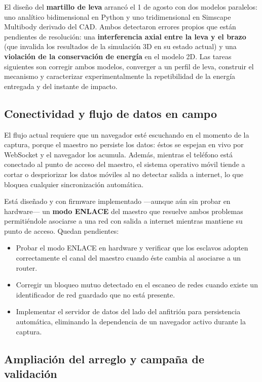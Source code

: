 El dise\~no del \textbf{martillo de leva} arranc\'o el 1 de agosto con dos modelos
paralelos: uno anal\'itico bidimensional en Python y uno tridimensional en Simscape
Multibody derivado del CAD. Ambos detectaron errores propios que est\'an pendientes de
resoluci\'on: una \textbf{interferencia axial entre la leva y el brazo} (que invalida los
resultados de la simulaci\'on 3D en su estado actual) y una \textbf{violaci\'on de la
conservaci\'on de energ\'ia} en el modelo 2D. Las tareas siguientes son corregir ambos
modelos, converger a un perfil de leva, construir el mecanismo y caracterizar
experimentalmente la repetibilidad de la energ\'ia entregada y del instante de impacto.

\subsection{Conectividad y flujo de datos en campo}

El flujo actual requiere que un navegador est\'e escuchando en el momento de la captura,
porque el maestro no persiste los datos: \'estos se espejan en vivo por WebSocket y el
navegador los acumula. Adem\'as, mientras el tel\'efono est\'a conectado al punto de acceso
del maestro, el sistema operativo m\'ovil tiende a cortar o despriorizar los datos
m\'oviles al no detectar salida a internet, lo que bloquea cualquier sincronizaci\'on
autom\'atica.

Est\'a dise\~nado y con firmware implementado ---aunque a\'un sin probar en hardware--- un
\textbf{modo ENLACE} del maestro que resuelve ambos problemas permiti\'endole asociarse a
una red con salida a internet mientras mantiene su punto de acceso. Quedan pendientes:

\begin{itemize}[itemsep=0.15em]
    \item Probar el modo ENLACE en hardware y verificar que los esclavos adopten
    correctamente el canal del maestro cuando \'este cambia al asociarse a un router.
    \item Corregir un bloqueo mutuo detectado en el escaneo de redes cuando existe un
    identificador de red guardado que no est\'a presente.
    \item Implementar el servidor de datos del lado del anfitri\'on para persistencia
    autom\'atica, eliminando la dependencia de un navegador activo durante la captura.
\end{itemize}

\subsection{Ampliaci\'on del arreglo y campa\~na de validaci\'on}

